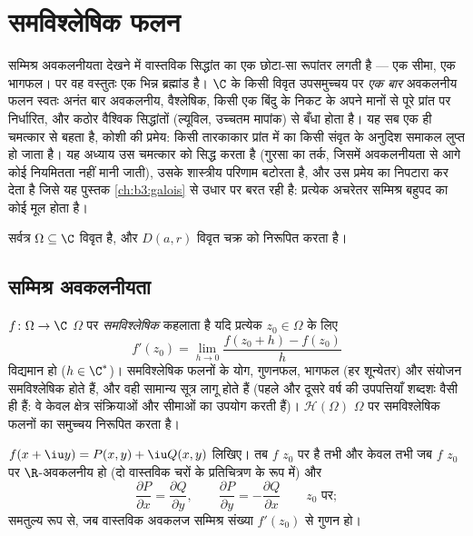 \chapter{समविश्लेषिक फलन}\label{ch:b3:holomorphic}

सम्मिश्र अवकलनीयता देखने में वास्तविक सिद्धांत का एक छोटा-सा
रूपांतर लगती है --- एक सीमा, एक भागफल। पर वह वस्तुतः एक भिन्न
ब्रह्मांड है। $\C$ के किसी विवृत उपसमुच्चय पर \emph{एक बार}
अवकलनीय फलन स्वतः अनंत बार अवकलनीय, वैश्लेषिक, किसी एक बिंदु के
निकट के अपने मानों से पूरे प्रांत पर निर्धारित, और कठोर वैश्विक
सिद्धांतों (ल्यूविल, उच्चतम मापांक) से बँधा होता है। यह सब एक ही
चमत्कार से बहता है, कोशी की प्रमेय: किसी तारकाकार प्रांत में
 का किसी संवृत  के अनुदिश समाकल लुप्त हो जाता है।
यह अध्याय उस चमत्कार को सिद्ध करता है (गुरसा का तर्क, जिसमें
अवकलनीयता से आगे कोई नियमितता नहीं मानी जाती), उसके शास्त्रीय
परिणाम बटोरता है, और उस प्रमेय का निपटारा कर देता है जिसे यह
पुस्तक \cref{ch:b3:galois} से उधार पर बरत रही है: प्रत्येक अचरेतर सम्मिश्र बहुपद
का कोई मूल होता है।

सर्वत्र $\Omega \subseteq \C$ विवृत है, और $D(a, r)$ विवृत चक्र को निरूपित करता है।

\section{सम्मिश्र अवकलनीयता}

\begin{definition}\label{def:b3:holomorphic:holo}
$f \colon \Omega \to \C$ $\Omega$ पर \emph{समविश्लेषिक} कहलाता है
यदि प्रत्येक $z_0 \in \Omega$ के लिए
\[
f'(z_0) = \lim_{h\to0}\frac{f(z_0 + h) - f(z_0)}{h}
\]
विद्यमान हो ($h \in \C^*$)। समविश्लेषिक फलनों के योग, गुणनफल, भागफल
(हर शून्येतर) और संयोजन समविश्लेषिक होते हैं, और वही सामान्य
सूत्र लागू होते हैं (पहले और दूसरे वर्ष की उपपत्तियाँ शब्दशः वैसी
ही हैं: वे केवल क्षेत्र संक्रियाओं और सीमाओं का उपयोग करती हैं)।
$\mathcal H(\Omega)$ $\Omega$ पर समविश्लेषिक फलनों का समुच्चय निरूपित करता है।
\end{definition}

\begin{proposition}[कोशी--रीमान]
\label{prop:b3:holomorphic:cauchyriemann}
$f(x + \iu y) = P(x,y) + \iu Q(x,y)$ लिखिए। तब $f$ $z_0$ पर  है तभी और केवल तभी जब
$f$ $z_0$ पर $\R$-अवकलनीय हो (दो वास्तविक चरों के प्रतिचित्रण के
रूप में) और
\[
\frac{\partial P}{\partial x} = \frac{\partial Q}{\partial y},
\qquad
\frac{\partial P}{\partial y} = -\frac{\partial Q}{\partial x}
\qquad z_0 \text{ पर} ;
\]
समतुल्य रूप से, जब वास्तविक अवकलज सम्मिश्र संख्या $f'(z_0)$ से गुणन हो।
\end{proposition}

